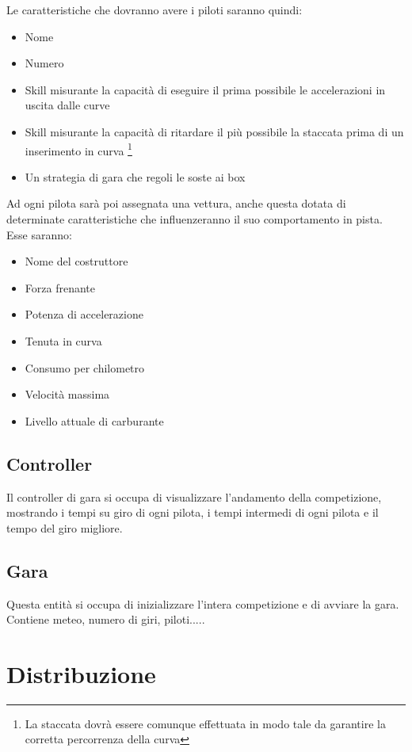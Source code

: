\documentclass[a4paper,11pt, twoside]{book}
\begin{document}
	Le caratteristiche che dovranno avere i piloti saranno quindi:
	
	\begin{itemize}
	  \item Nome 
	  \item Numero
	  \item Skill misurante la capacità di eseguire il prima possibile le accelerazioni in uscita dalle curve
	  \item Skill misurante la capacità di ritardare il più possibile la staccata prima di un inserimento in curva 
		\footnote{La staccata dovrà essere comunque effettuata in modo tale da garantire la 
		corretta percorrenza della curva}
	  \item Un strategia di gara che regoli le soste ai box
	\end{itemize}
	
	
	Ad ogni pilota sarà poi assegnata una vettura, anche questa dotata di determinate caratteristiche che influenzeranno il suo
	comportamento in pista. Esse saranno:
	
	\begin{itemize}
	  \item Nome del costruttore
	  \item Forza frenante
	  \item Potenza di accelerazione
	  \item Tenuta in curva
	  \item Consumo per chilometro
	  \item Velocità massima
	  \item Livello attuale di carburante
	\end{itemize}

      \subsection{Controller}
	Il controller di gara si occupa di visualizzare l'andamento della competizione, mostrando
	i tempi su giro di ogni pilota, i tempi intermedi di ogni pilota e il tempo del giro migliore.
	
      \subsection{Gara}
	Questa entità si occupa di inizializzare l'intera competizione e di avviare la gara.
	Contiene meteo, numero di giri, piloti.....
	  
    \section{Distribuzione}
	
\end{document}
